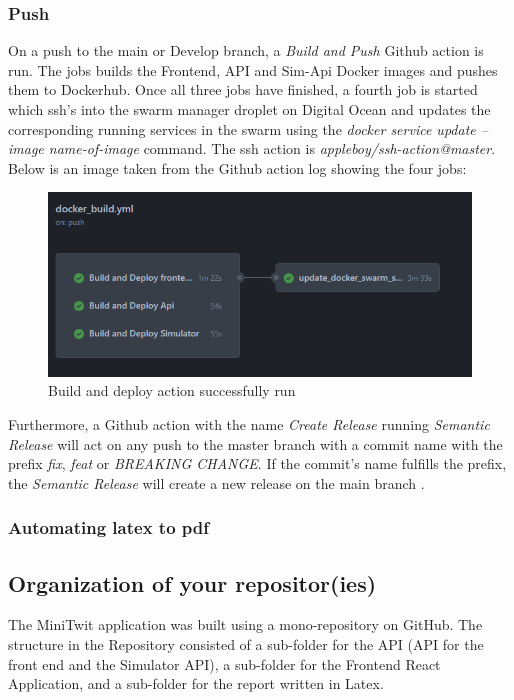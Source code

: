 \subsubsection{Push}
On a push to the main or Develop branch, a \textit{Build and Push} Github action is run. The jobs builds the Frontend, API and Sim-Api Docker images and pushes them to Dockerhub. Once all three jobs have finished, a fourth job is started which ssh's into the swarm manager droplet on Digital Ocean and updates the corresponding running services in the swarm using the \textit{docker service update --image name-of-image} command. The ssh action is \textit{appleboy/ssh-action@master}\cite{ssh-action}. Below is an image taken from the Github action log showing the four jobs:

\begin{figure}[H]
    \centering
    \includegraphics[width=1\linewidth]{report/images/build-and-deploy-action.png}
    \caption{Build and deploy action successfully run}
    \label{fig:build-and-deploy}
\end{figure}

Furthermore, a Github action with the name \textit{Create Release} running \textit{Semantic Release} will act on any push to the master branch with a commit name with the prefix \textit{fix}, \textit{feat} or \textit{BREAKING CHANGE}. If the commit's name fulfills the prefix, the \textit{Semantic Release} will create a new release on the main branch \cite{semantic-release}.

\subsubsection{Automating latex to pdf}

\subsection{Organization of your repositor(ies)}
The MiniTwit application was built using a mono-repository on GitHub. The structure in the Repository consisted of a sub-folder for the API (API for the front end and the Simulator API), a sub-folder for the Frontend React Application, and a sub-folder for the report written in Latex. 

